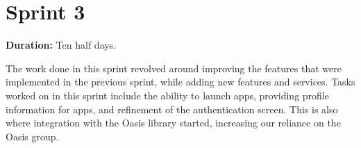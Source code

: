 \section*{Sprint 3}%

\textbf{Duration:} Ten half days. \newline

The work done in this sprint revolved around improving the features that were implemented in the previous sprint, while adding new features and services. 
Tasks worked on in this sprint include the ability to launch apps, providing profile information for apps, and refinement of the authentication screen. 
This is also where integration with the Oasis library started, increasing our reliance on the Oasis group. 